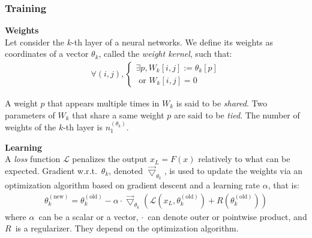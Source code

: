 
\subsubsection{Training}

\begin{definition}\textbf{Weights}\\
Let consider the $k$-th layer of a neural networks. We define its weights as coordinates of a vector $\theta_k$, called the \emph{weight kernel}, such that:
\begin{gather*}
  \forall (i,j),
    \begin{cases}
      \exists p, W_k[i,j] := \theta_k[p] \\
      \text{ or } W_k[i,j] = 0
    \end{cases}
\end{gather*}
\end{definition}
A weight $p$ that appears multiple times in $W_k$ is said to be \emph{shared}. Two parameters of $W_k$ that share a same weight $p$ are said to be \emph{tied}. The number of weights of the $k$-th layer is $n_1^{(\theta_k)}$.

\begin{remark}\textbf{Learning}\\
A \emph{loss} function $\mathcal{L}$ penalizes the output $x_L = F(x)$ relatively to what can be expected. Gradient w.r.t.~$\theta_k$, denoted $\vec{\bigtriangledown}_{\theta_k}$, is used to update the weights via an optimization algorithm based on gradient descent and a learning rate $\alpha$, that is:
\begin{gather}
\theta_k^{(\text{new})} = \theta_k^{(\text{old})} - \alpha \cdot \vec{\bigtriangledown}_{\theta_k} \left( \mathcal{L}\left( x_L, \theta_k^{(\text{old})} \right) + R\left( \theta_k^{(\text{old})} \right) \right)
\end{gather}
where $\alpha$~can be a scalar or a vector, $\cdot$~can denote outer or pointwise product, and $R$~is a regularizer. They depend on the optimization algorithm.
\end{remark}


